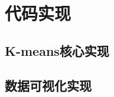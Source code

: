 \documentclass[12pt, a4paper]{article}
\begin{document}
\appendix
\section{代码实现}
\subsection{K-means核心实现}


\subsection{数据可视化实现}

\end{document}
